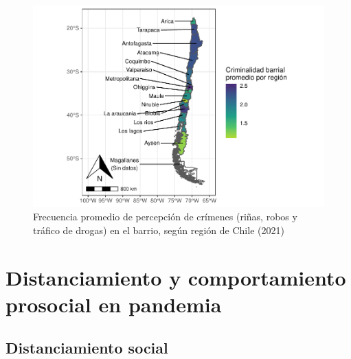 \documentclass[
  12pt,
]{book}
\begin{document}
\begin{figure}

{\centering \includegraphics{reporte-elsoc_files/figure-latex/confli-region-1} 

}

\caption{Frecuencia promedio de percepción de crímenes (riñas, robos y tráfico de drogas) en el barrio, según región de Chile (2021)}\label{fig:confli-region}
\end{figure}

\hypertarget{distanciamiento-y-comportamiento-prosocial-en-pandemia}{%
\chapter{Distanciamiento y comportamiento prosocial en pandemia}\label{distanciamiento-y-comportamiento-prosocial-en-pandemia}}

\hypertarget{distanciamiento-social}{%
\section{Distanciamiento social}\label{distanciamiento-social}}
\end{document}
